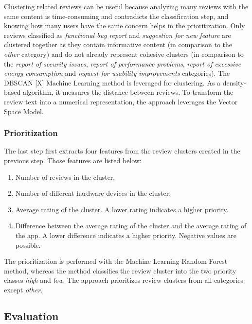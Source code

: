Clustering related reviews can be useful because analyzing many reviews with the same content is time-consuming and contradicts the classification step, and knowing how many users have the same concern helps in the prioritization.
Only reviews classified as \textit{functional bug report} and \textit{suggestion for new feature} are clustered together as they contain informative content (in comparison to the \textit{other} category) and do not already represent cohesive clusters (in comparison to the \textit{report of security issues}, \textit{report of performance problems}, \textit{report of excessive energy consumption} and \textit{request for usability improvements} categories). 
The DBSCAN [X] Machine Learning method is leveraged for clustering. As a density-based algorithm, it measures the distance between reviews. To transform the review text into a numerical representation, the approach leverages the Vector Space Model.

\subsubsection{Prioritization}

The last step first extracts four features from the review clusters created in the previous step. Those features are listed below:

\begin{enumerate}
    \item Number of reviews in the cluster.
    \item Number of different hardware devices in the cluster.
    \item Average rating of the cluster. A lower rating indicates a higher priority.
    \item Difference between the average rating of the cluster and the average rating of the app. A lower difference indicates a higher priority. Negative values are possible.
\end{enumerate}

The prioritization is performed with the Machine Learning Random Forest method, whereas the method classifies the review cluster into the two priority classes \textit{high} and \textit{low}. The approach prioritizes review clusters from all categories except \textit{other}.

\subsection{Evaluation}

